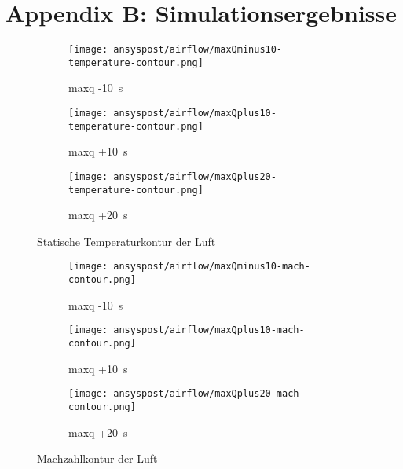 \section*{Appendix B: Simulationsergebnisse}\label{Anh:simulation}

\begin{figure}[H]
    \centering

    \begin{subfigure}{\textwidth}
        \centering
        \texttt{[image: ansyspost/airflow/maxQminus10-temperature-contour.png]}
        \caption{\ac{maxq} -\SI{10}{\second}}
        \label{fig:maxQminus10_temp_contour}
    \end{subfigure}

    \begin{subfigure}{\textwidth}
        \centering
        \texttt{[image: ansyspost/airflow/maxQplus10-temperature-contour.png]}
        \caption{\ac{maxq} +\SI{10}{\second}}
        \label{fig:maxQplus10_temp_contour}
    \end{subfigure}

    \begin{subfigure}{\textwidth}
        \centering
        \texttt{[image: ansyspost/airflow/maxQplus20-temperature-contour.png]}
        \caption{\ac{maxq} +\SI{20}{\second}}
        \label{fig:maxQplus20_temp_contour}
    \end{subfigure}

    \caption{Statische Temperaturkontur der Luft}
    \label{fig:airflow_temp_contour_continued}
\end{figure}

\begin{figure}[H]
    \centering

    \begin{subfigure}{\textwidth}
        \centering
        \texttt{[image: ansyspost/airflow/maxQminus10-mach-contour.png]}
        \caption{\ac{maxq} -\SI{10}{\second}}
        \label{fig:maxQminus10_mach_contour}
    \end{subfigure}

    \begin{subfigure}{\textwidth}
        \centering
        \texttt{[image: ansyspost/airflow/maxQplus10-mach-contour.png]}
        \caption{\ac{maxq} +\SI{10}{\second}}
        \label{fig:maxQplus10_mach_contour}
    \end{subfigure}

    \begin{subfigure}{\textwidth}
        \centering
        \texttt{[image: ansyspost/airflow/maxQplus20-mach-contour.png]}
        \caption{\ac{maxq} +\SI{20}{\second}}
        \label{fig:maxQplus20_mach_contour}
    \end{subfigure}

    \caption{Machzahlkontur der Luft}
    \label{fig:airflow_mach_contour_continued}
\end{figure}

